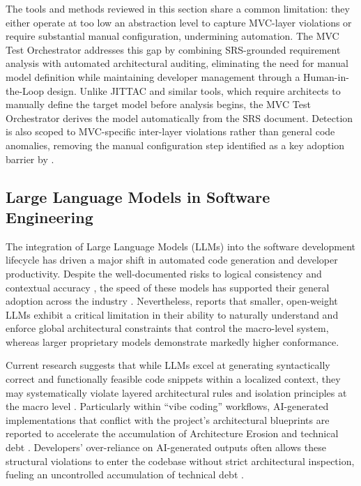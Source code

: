 The tools and methods reviewed in this section share a common
limitation: they either operate at too low an abstraction level to
capture MVC-layer violations or require substantial manual
configuration, undermining automation. The MVC Test Orchestrator
addresses this gap by combining SRS-grounded requirement analysis with
automated architectural auditing, eliminating the need for manual
model definition while maintaining developer management through a
Human-in-the-Loop design. Unlike JITTAC and similar tools, which
require architects to manually define the target model before analysis
begins, the MVC Test Orchestrator derives the model automatically from
the SRS document. Detection is also scoped to MVC-specific inter-layer
violations rather than general code anomalies, removing the manual
configuration step identified as a key adoption barrier by \citet{Ali2018}.

\subsection{Large Language Models in Software Engineering}
\label{sec:related_llm}

The integration of Large Language Models (LLMs) into the software
development lifecycle has driven a major shift in automated code
generation and developer productivity. Despite the well-documented
risks to logical consistency and contextual accuracy \citep{Siddiq2024},
the speed of these models has supported their general adoption across
the industry \citep{Hou2024}. Nevertheless, \citet{Slater2025} reports that smaller, open-weight
LLMs exhibit a critical limitation in their ability to naturally
understand and enforce global architectural constraints that control
the macro-level system, whereas larger proprietary models demonstrate
markedly higher conformance.

Current research suggests that while LLMs excel at generating
syntactically correct and functionally feasible code snippets within a
localized context, they may systematically violate layered architectural
rules and isolation principles at the macro level
\citep{Slater2025, Zhu2026}. Particularly within ``vibe coding'' workflows, AI-generated
implementations that conflict with the project's architectural
blueprints are reported to accelerate the accumulation of
Architecture Erosion and technical debt
\citep{Slater2025, Waseem2025, Ehsani2026}. Developers' over-reliance on
AI-generated outputs often allows these structural violations to enter
the codebase without strict architectural inspection, fueling an
uncontrolled accumulation of technical debt \citep{Huang2026}.

